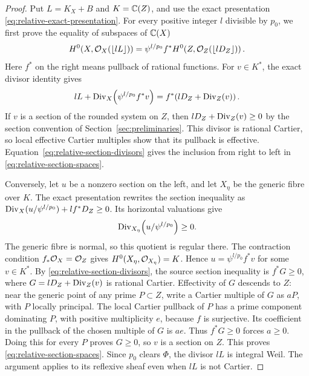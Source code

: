 \begin{proof}
Put $L=K_X+B$ and $K=\mathbb C(Z)$, and use the exact presentation
\eqref{eq:relative-exact-presentation}. For every positive integer $l$
divisible by $p_0$, we first prove the equality of subspaces of $\mathbb C(X)$
\begin{equation}\label{eq:relative-section-spaces}
 H^0\!\left(X,\mathcal O_X(\lfloor lL\rfloor)\right)
   =\psi^{l/p_0}f^*
      H^0\!\left(Z,\mathcal O_Z(\lfloor lD_Z\rfloor)\right).
\end{equation}
Here $f^*$ on the right means pullback of rational functions. For
$v\in K^*$, the exact divisor identity gives
\begin{equation}\label{eq:relative-section-divisors}
 lL+\operatorname{Div}_X\!\left(\psi^{l/p_0}f^*v\right)
    =f^*\!\left(lD_Z+\operatorname{Div}_Z(v)\right).
\end{equation}
If $v$ is a section of the rounded system on $Z$, then
$lD_Z+\operatorname{Div}_Z(v)\geq0$ by the section convention of
Section~\ref{sec:preliminaries}. This divisor is rational Cartier, so
local effective Cartier multiples show that its pullback is effective.
Equation~\eqref{eq:relative-section-divisors} gives the inclusion from
right to left in \eqref{eq:relative-section-spaces}.

Conversely, let $u$ be a nonzero section on the left, and let $X_\eta$
be the generic fibre over $K$. The exact presentation rewrites the
section inequality as
$\operatorname{Div}_X(u/\psi^{l/p_0})+lf^*D_Z\geq0$. Its horizontal valuations give
\[
 \operatorname{Div}_{X_\eta}\!\left(u/\psi^{l/p_0}\right)\geq0.
\]
The generic fibre is normal, so this quotient is regular there. The
contraction condition $f_*\mathcal O_X=\mathcal O_Z$ gives
$H^0(X_\eta,\mathcal O_{X_\eta})=K$. Hence
$u=\psi^{l/p_0}f^*v$ for some $v\in K^*$. By
\eqref{eq:relative-section-divisors}, the source section inequality is
$f^*G\geq0$, where $G=lD_Z+\operatorname{Div}_Z(v)$ is rational Cartier.
Effectivity of $G$ descends to $Z$: near the generic point of any prime
$P\subset Z$, write a Cartier multiple of $G$ as $aP$, with $P$
locally principal. The local Cartier pullback of $P$ has a prime
component dominating $P$, with positive multiplicity $e$, because
$f$ is surjective. Its coefficient in the pullback of the chosen
multiple of $G$ is $ae$. Thus $f^*G\geq0$ forces $a\geq0$.
Doing this for every $P$ proves $G\geq0$, so $v$ is a section on $Z$.
This proves \eqref{eq:relative-section-spaces}. Since $p_0$ clears
$\Phi$, the divisor $lL$ is integral Weil. The argument applies to its
reflexive sheaf even when $lL$ is not Cartier.


\end{proof}
